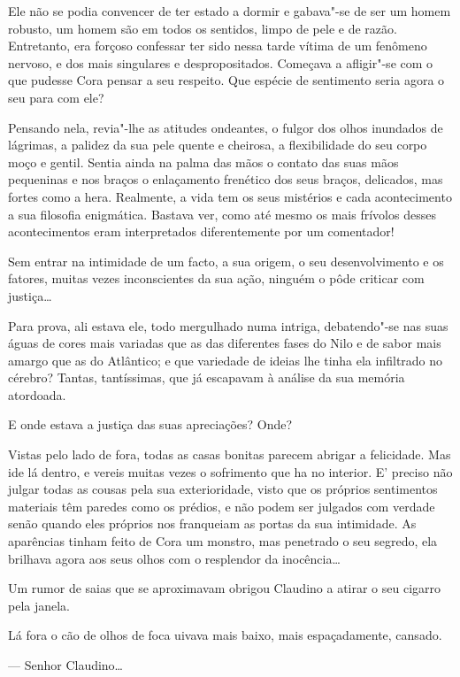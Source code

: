 Ele não se podia convencer de ter estado a dormir e gabava"-se de ser um
homem robusto, um homem são em todos os sentidos, limpo de pele e de
razão. Entretanto, era forçoso confessar ter sido nessa tarde vítima de
um fenômeno nervoso, e dos mais singulares e despropositados. Começava a
afligir"-se com o que pudesse Cora pensar a seu respeito. Que espécie de
sentimento seria agora o seu para com ele?

Pensando nela, revia"-lhe as atitudes ondeantes, o fulgor dos olhos
inundados de lágrimas, a palidez da sua pele quente e cheirosa, a
flexibilidade do seu corpo moço e gentil. Sentia ainda na palma das mãos
o contato das suas mãos pequeninas e nos braços o enlaçamento frenético
dos seus braços, delicados, mas fortes como a hera. Realmente, a vida
tem os seus mistérios e cada acontecimento a sua filosofia enigmática.
Bastava ver, como até mesmo os mais frívolos desses acontecimentos eram
interpretados diferentemente por um comentador!

Sem entrar na intimidade de um facto, a sua origem, o seu
desenvolvimento e os fatores, muitas vezes inconscientes da sua ação,
ninguém o pôde criticar com justiça\ldots{}

Para prova, ali estava ele, todo mergulhado numa intriga, debatendo"-se
nas suas águas de cores mais variadas que as das diferentes fases do
Nilo e de sabor mais amargo que as do Atlântico; e que variedade de
ideias lhe tinha ela infiltrado no cérebro? Tantas, tantíssimas, que já
escapavam à análise da sua memória atordoada.

E onde estava a justiça das suas apreciações? Onde?

Vistas pelo lado de fora, todas as casas bonitas parecem abrigar a
felicidade. Mas ide lá dentro, e vereis muitas vezes o sofrimento que ha
no interior. E' preciso não julgar todas as cousas pela sua
exterioridade, visto que os próprios sentimentos materiais têm paredes
como os prédios, e não podem ser julgados com verdade senão quando eles
próprios nos franqueiam as portas da sua intimidade. As aparências
tinham feito de Cora um monstro, mas penetrado o seu segredo, ela
brilhava agora aos seus olhos com o resplendor da inocência\ldots{}

Um rumor de saias que se aproximavam obrigou Claudino a atirar o seu
cigarro pela janela.

Lá fora o cão de olhos de foca uivava mais baixo, mais espaçadamente,
cansado.

--- Senhor Claudino\ldots{}

